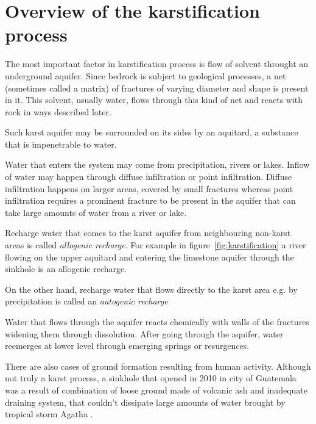 \section{Overview of the karstification process}

The most important factor in karstification process is flow of solvent throught an
underground aquifer. Since bedrock is subject to geological processes, a
net (sometimes called a matrix) of fractures of varying diameter and shape is
present in it. This solvent, usually water, flows through this kind of net and
reacts with rock in ways described later.

Such karst aquifer may be surrounded on its sides by an aquitard, a substance
that is impenetrable to water.

Water that enters the system may come from precipitation, rivers or lakes. Inflow
of water may happen through diffuse infiltration or point infiltration.
Diffuse infiltration happens on larger areas, covered by small fractures whereas
point infiltration requires a prominent fracture to be present in the aquifer
that can take large amounts of water from a river or lake.

Recharge water that comes to the karst aquifer from neighbouring non-karst areas
is called \emph{allogenic recharge}. For example in figure~\ref{fig:karstification}
a river flowing on the upper aquitard and entering the limestone aquifer through
the sinkhole is an allogenic recharge.

On the other hand, recharge water that flows directly to the karst area e.g. by
precipitation is called an \emph{autogenic recharge}

Water that flows through the aquifer reacts chemically with walls of the
fractures widening them through dissolution. After going through the aquifer,
water reemerges at lower level through emerging springs or resurgences.

There are also cases of ground formation resulting from human activity.
Although not truly a karst process, a sinkhole that opened in 2010 in city of
Guatemala was a result of combination of loose ground made of volcanic ash and
inadequate draining system, that couldn't dissipate large amounts of water
brought by tropical storm Agatha \parencite{times2010}.

